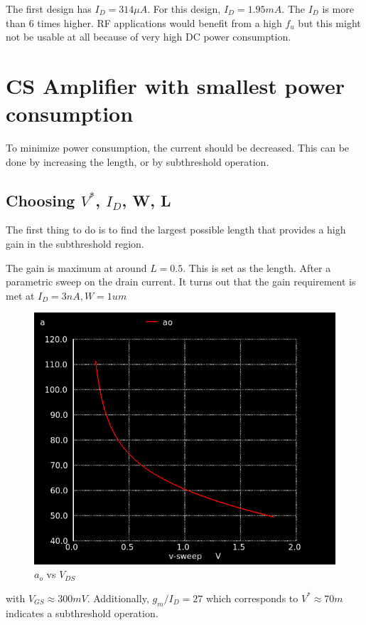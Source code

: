 \documentclass[conference]{IEEEtran}
\begin{document}
\vspace{8pt}
The first design has $I_D = 314\mu A$. For this design, $I_D=1.95mA$. The $I_D$ is more than 6 times higher. RF applications would benefit from a high $f_u$ but this might not be usable at all because of very high DC power consumption. 

\vspace{8pt}
\section{CS Amplifier with smallest power consumption}
To minimize power consumption, the current should be decreased. This can be done by increasing the length, or by subthreshold operation. 

\subsection{Choosing $V^*$, $I_{D}$, W, L}
The first thing to do is to find the largest possible length that provides a high gain in the subthreshold region. 

\vspace{8pt}
The gain is maximum at around $L=0.5$. This is set as the length. After a parametric sweep on the drain current. It turns out that the gain requirement is met at $I_{D}=3nA, W=1um$ 
\begin{figure}[H]
	\centering 
	\includegraphics[scale=0.35]{id3n.png}
	\caption{$a_o$ vs $V_{DS}$}
	\label{in_3d}	
\end{figure}
with $V_{GS} \approx 300mV$. Additionally, $g_m/I_D=27$ which corresponds to $V^* \approx 70m$ indicates a subthreshold operation.
\end{document}
